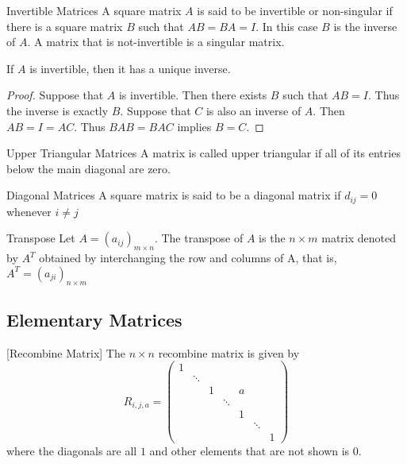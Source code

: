 \begin{defn}{Invertible Matrices}{} A square matrix $A$ is said to be invertible or non-singular if there is a square matrix $B$ such that $AB=BA=I$. In this case $B$ is the inverse of $A$. A matrix that is not-invertible is a singular matrix. 
\end{defn}

\begin{thm}{}{} If $A$ is invertible, then it has a unique inverse. 
\end{thm}
\begin{proof} Suppose that $A$ is invertible. Then there exists $B$ such that $AB=I$. Thus the inverse is exactly $B$. Suppose that $C$ is also an inverse of $A$. Then $AB=I=AC$. Thus $BAB=BAC$ implies $B=C$. 
\end{proof}

\begin{defn}{Upper Triangular Matrices}{} A matrix is called upper triangular if all of its entries below the main diagonal are zero. 
\end{defn}

\begin{defn}{Diagonal Matrices}{} A square matrix is said to be a diagonal matrix if $d_{ij}=0$ whenever $i\neq j$
\end{defn}

\begin{defn}{Transpose}{} Let $A=(a_{ij})_{m\times n}$.  The transpose of $A$ is the $n\times m$ matrix denoted by $A^T$ obtained by interchanging the row and columns of A, that is, $A^T=(a_{ji})_{n\times m}$
\end{defn}

\subsection{Elementary Matrices}
\begin{defn}{}{}[Recombine Matrix] The $n\times n$ recombine matrix is given by $$R_{i,j,a}=
\begin{pmatrix}
1&&&&&&\\
&\ddots&&&&&\\
&&1&&a&&\\
&&&\ddots&&&\\
&&&&1&&\\
&&&&&\ddots&\\
&&&&&&1
\end{pmatrix}$$ where the diagonals are all $1$ and other elements that are not shown is $0$.
\end{defn}

